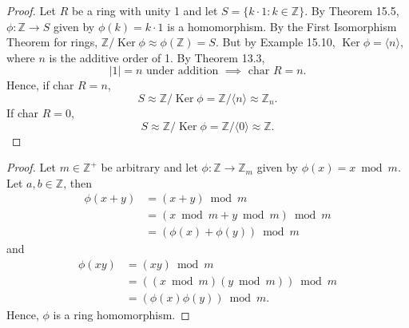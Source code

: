 \documentclass{article}
\newtheorem{corollary}{Corollary}[theorem]
\theoremstyle{definition}
\DeclareMathOperator{\Ker}{Ker}
\begin{document}
\begin{proof}
     Let $R$ be a ring with unity 1 and let $S=\{k\cdot1:k\in\mathbb{Z}\}$. By Theorem 15.5, $\phi:\mathbb{Z}\to S$ given by $\phi(k)=k\cdot1$ is a homomorphism. By the First Isomorphism Theorem for rings, $\mathbb{Z}/\Ker\phi\approx \phi(\mathbb{Z})=S$. But by Example 15.10, $\Ker\phi=\langle n\rangle$, where $n$ is the additive order of 1. By Theorem 13.3,
     \begin{equation*}
         |1|=n \text{ under addition } \implies \text{ char } R=n.
     \end{equation*}
     Hence, if char $R=n$,
     \begin{equation*}
          S\approx\mathbb{Z}/\Ker\phi=\mathbb{Z}/\langle n\rangle\approx\mathbb{Z}_n.
     \end{equation*}
     If char $R=0$,
     \begin{equation*}
         S\approx\mathbb{Z}/\Ker\phi=\mathbb{Z}/\langle0\rangle\approx\mathbb{Z}.
     \end{equation*}
\end{proof}

\noindent{}

\begin{proof}
     Let $m\in\mathbb{Z}^+$ be arbitrary and let $\phi:\mathbb{Z}\to\mathbb{Z}_m$ given by $\phi(x)=x\bmod{m}$. Let $a,b\in\mathbb{Z}$, then
     \begin{align*}
         \phi(x+y)&=(x+y)\bmod{m} \\
         &=(x\bmod{m}+y\bmod{m})\bmod{m} \\
         &=(\phi(x)+\phi(y))\bmod{m}
     \end{align*}
     and
     \begin{align*}
         \phi(xy)&=(xy)\bmod{m} \\
         &=((x\bmod{m})(y\bmod{m}))\bmod{m} \\
         &=(\phi(x)\phi(y))\bmod{m}.
     \end{align*}
     Hence, $\phi$ is a ring homomorphism. 
\end{proof}

\noindent{}
\end{document}
